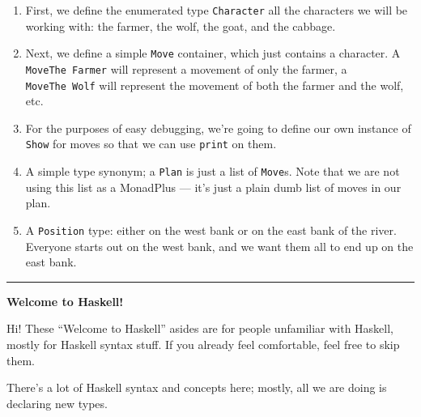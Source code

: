 \documentclass[]{article}
\begin{document}
\begin{enumerate}
\def\labelenumi{\arabic{enumi}.}
\tightlist
\item
  First, we define the enumerated type \texttt{Character} all the
  characters we will be working with: the farmer, the wolf, the goat,
  and the cabbage.
\item
  Next, we define a simple \texttt{Move} container, which just contains
  a character. A \texttt{MoveThe\ Farmer} will represent a movement of
  only the farmer, a \texttt{MoveThe\ Wolf} will represent the movement
  of both the farmer and the wolf, etc.
\item
  For the purposes of easy debugging, we're going to define our own
  instance of \texttt{Show} for moves so that we can use \texttt{print}
  on them.
\item
  A simple type synonym; a \texttt{Plan} is just a list of
  \texttt{Move}s. Note that we are not using this list as a MonadPlus
  --- it's just a plain dumb list of moves in our plan.
\item
  A \texttt{Position} type: either on the west bank or on the east bank
  of the river. Everyone starts out on the west bank, and we want them
  all to end up on the east bank.
\end{enumerate}

\begin{center}\rule{0.5\linewidth}{\linethickness}\end{center}

\textbf{Welcome to Haskell!}

Hi! These ``Welcome to Haskell'' asides are for people unfamiliar with
Haskell, mostly for Haskell syntax stuff. If you already feel
comfortable, feel free to skip them.

There's a lot of Haskell syntax and concepts here; mostly, all we are
doing is declaring new types.
\end{document}

